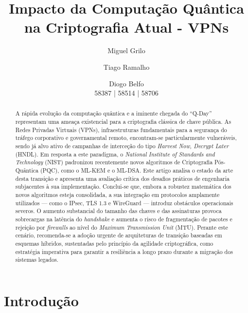 \documentclass[runningheads]{llncs}
\title{Impacto da Computação Quântica\\na Criptografia Atual - VPNs}
\author{Miguel Grilo\inst{1} \and Tiago Ramalho\inst{2} \and Diogo Belfo\inst{3}\\
58387 | 58514 | 58706\\
\email{\{l58387, l58514, l58706\}@alunos.uevora.pt}}
\institute{Escola de Ciências e Tecnologias, Universidade de Évora, Portugal \\
UC: Segurança Informática\\}
\begin{document}
\maketitle              

\begin{abstract}
A rápida evolução da computação quântica e a iminente chegada do ``Q-Day'' representam uma ameaça existencial para a criptografia clássica de chave pública. As Redes Privadas Virtuais (VPNs), infraestruturas fundamentais para a segurança do tráfego corporativo e governamental remoto, encontram-se particularmente vulneráveis, sendo já alvo ativo de campanhas de interceção do tipo \textit{Harvest Now, Decrypt Later} (HNDL). Em resposta a este paradigma, o \textit{National Institute of Standards and Technology} (NIST) padronizou recentemente novos algoritmos de Criptografia Pós-Quântica (PQC), como o ML-KEM e o ML-DSA. Este artigo analisa o estado da arte desta transição e apresenta uma avaliação crítica dos desafios práticos de engenharia subjacentes à sua implementação. Conclui-se que, embora a robustez matemática dos novos algoritmos esteja consolidada, a sua integração em protocolos amplamente utilizados — como o IPsec, TLS 1.3 e WireGuard — introduz obstáculos operacionais severos. O aumento substancial do tamanho das chaves e das assinaturas provoca sobrecargas na latência do \textit{handshake} e aumenta o risco de fragmentação de pacotes e rejeição por \textit{firewalls} ao nível do \textit{Maximum Transmission Unit} (MTU). Perante este cenário, recomenda-se a adoção urgente de arquiteturas de transição baseadas em esquemas híbridos, sustentadas pelo princípio da agilidade criptográfica, como estratégia imperativa para garantir a resiliência a longo prazo durante a migração dos sistemas legados.

\end{abstract}

\section{Introdução}
\end{document}
